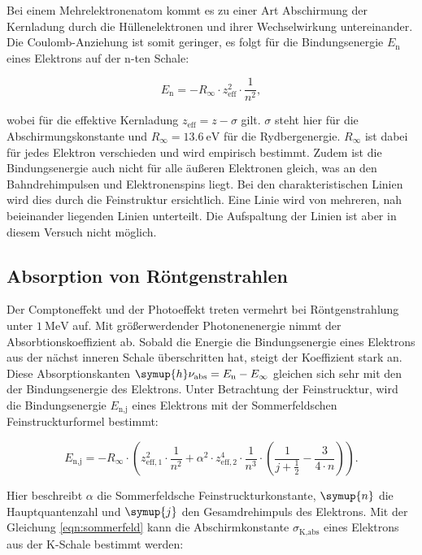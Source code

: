 Bei einem Mehrelektronenatom kommt es zu einer Art Abschirmung der Kernladung durch die Hüllenelektronen und ihrer Wechselwirkung untereinander.
Die Coulomb-Anziehung ist somit geringer, es folgt für die Bindungsenergie $E_\text{n}$ eines Elektrons auf der n-ten Schale:

\begin{equation*}
    E_\text{n} = -R_{\infty} \cdot z^2_\text{eff} \cdot \frac{1}{n^2},
\end{equation*}

wobei für die effektive Kernladung $z_\text{eff} = z - \sigma$ gilt.
$\sigma$ steht hier für die Abschirmungskonstante und $R_\infty = \SI{13.6}{\electronvolt}$ für die Rydbergenergie.
$R_\infty$ ist dabei für jedes Elektron verschieden und wird empirisch bestimmt.
Zudem ist die Bindungsenergie auch nicht für alle äußeren Elektronen gleich, was an den Bahndrehimpulsen und Elektronenspins liegt.
Bei den charakteristischen Linien wird dies durch die Feinstruktur ersichtlich.
Eine Linie wird von mehreren, nah beieinander liegenden Linien unterteilt.
Die Aufspaltung der Linien ist aber in diesem Versuch nicht möglich.

\subsection{Absorption von Röntgenstrahlen}
\label{Absorption}

Der Comptoneffekt und der Photoeffekt treten vermehrt bei Röntgenstrahlung unter $\SI{1}{\mega\electronvolt}$ auf.
Mit größerwerdender Photonenenergie nimmt der Absorbtionskoeffizient ab.
Sobald die Energie die Bindungsenergie eines Elektrons aus der nächst inneren Schale überschritten hat, steigt der Koeffizient stark an.
Diese Absorptionskanten $\symup{h} \nu_\text{abs} = E_\text{n} - E_\infty$ gleichen sich sehr mit den der Bindungsenergie des Elektrons.
Unter Betrachtung der Feinstrucktur, wird die Bindungsenergie $E_\text{n,j}$ eines Elektrons mit der Sommerfeldschen Feinstruckturformel bestimmt:

\begin{equation}
    \label{eqn:sommerfeld}
    E_\text{n,j} = -R_\infty \cdot ( z^2_{\text{eff},1} \cdot \frac{1}{n^2} + \alpha^2 \cdot z^4_{\text{eff},2} \cdot \frac{1}{n^3} \cdot (\frac{1}{j + \frac{1}{2}} - \frac{3}{4 \cdot n})).
\end{equation}

Hier beschreibt $\alpha$ die Sommerfeldsche Feinstruckturkonstante, $\symup{n}$ die Hauptquantenzahl und $\symup{j}$ den Gesamdrehimpuls des Elektrons.
Mit der Gleichung \eqref{eqn:sommerfeld} kann die Abschirmkonstante $\sigma_\text{K,abs}$ eines Elektrons aus der K-Schale bestimmt werden:

